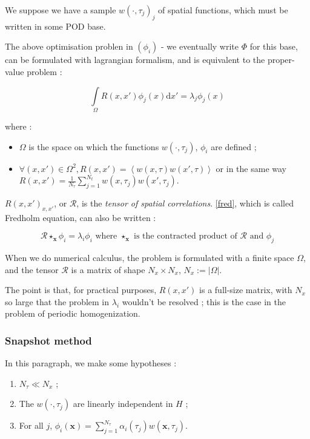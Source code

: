 We suppose we have a sample $w(\cdot,\tau_j)_j$ of spatial functions, which must be written in some POD base.

\par
The above optimisation problen in $(\phi_i)$ - we eventually write $\Phi$ for this base, %
can be formulated with lagrangian formalism, and is equivalent to the proper-value problem :

\begin{equation}\label{fred}
\int\limits_{\Omega}R(x,x')\phi_j (x)\text{d}x'=\lambda_j \phi_j (x)
\end{equation}

where :
\begin{itemize}
\item $\Omega$ is the space on which the functions $w(\cdot ,\tau_j)$, $\phi_i$ are defined ;
\item $\forall (x,x')\in\Omega^2 , R(x,x')=\left\langle w(x,\tau)w(x',\tau)\right\rangle$ or in the same way $R(x,x')=\frac{1}{N_{\tau}}\sum\limits_{j=1}^{N_t} w(x,\tau_j)w(x',\tau_j)$.
\end{itemize}

$R(x,x')_{x,x'}$, or $\mathcal{R}$, is the \emph{tensor of spatial correlations}. %
\ref{fred}, which is called Fredholm equation, can also be written :

\[\mathcal{R}\star_{\mathbf{x}}\phi_i=\lambda_i\phi_i\text{ where $\star_{\mathbf{x}}$ is the contracted product of $\mathcal{R}$ and $\phi_j$}\]

\etoile
When we do numerical calculus, the problem is formulated with a finite space $\Omega$, %
and the tensor $\mathcal{R}$ is a matrix of shape $N_x\times N_x$, $N_x :=|\Omega|$.

\par
The point is that, for practical purposes, $R(x,x')$ is a full-size matrix, with $N_x$ so large that the problem in $\lambda_i$ wouldn't be resolved ; %
this is the case in the problem of periodic homogenization.

\subsubsection{Snapshot method}

In this paragraph, we make some hypotheses :

\begin{enumerate}[label=(Snap \arabic*)]
\item\label{hs1} $N_{\tau}\ll N_x$ ;
\item\label{hs2} The $w(\cdot , \tau_j)$ are linearly independent in $H$ ;
\item\label{hs3} For all $j$, $\phi_i(\mathbf{x})=\sum\limits_{j=1}^{N_{\tau}}\alpha_i(\tau_j) w(\mathbf{x},\tau_j)$.
\end{enumerate}

